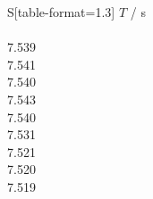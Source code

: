 \begin{subtable}{0.18\textwidth}
\centering
{}
\label{tab:magnet1-5}
\begin{tabular}{S[table-format=1.3]}
\toprule
{$T$ / s} \\
 \\
7.539 \\
7.541 \\
7.540 \\
7.543 \\
7.540 \\
7.531 \\
7.521 \\
7.520 \\
7.519 \\
\bottomrule
\end{tabular}
\end{subtable}